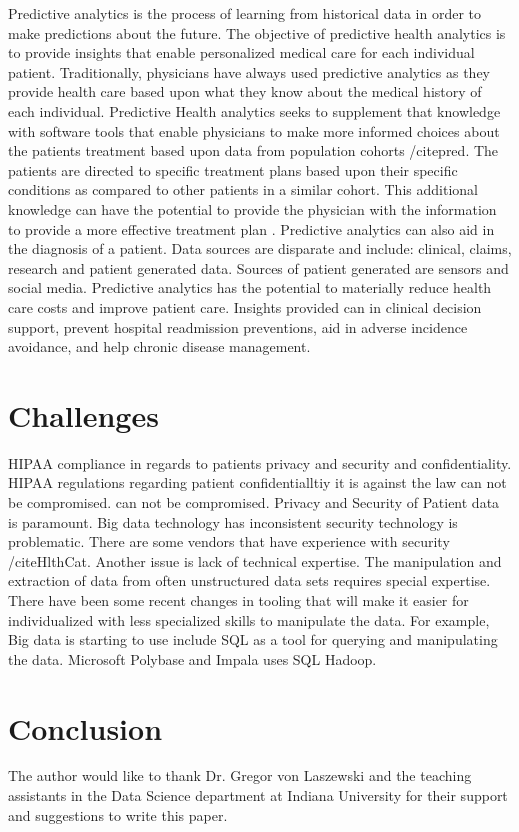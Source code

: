\documentclass[sigconf]{acmart}
\begin{document}
Predictive analytics is the process of learning from historical data in order to make predictions about the future. The objective of predictive health analytics is to provide insights that enable personalized medical care for each individual patient. Traditionally, physicians have always used predictive analytics as they provide health care based upon what they know about the medical history of each individual. Predictive Health analytics seeks to supplement that knowledge with software tools that enable physicians to make more informed choices about the patients treatment based upon data from population cohorts /cite{pred}.  The patients are directed to specific treatment plans based upon their specific conditions as compared to other patients in a similar cohort.  This additional knowledge can have the potential to provide the physician with the information to provide a more effective treatment plan \cite{www-google-pred}. Predictive analytics can also aid in the diagnosis of a patient. Data sources are disparate and include: clinical, claims, research and patient generated data. Sources of patient generated are sensors and social media.  
Predictive analytics has the potential to materially reduce health care costs and improve patient care.   Insights provided can in clinical decision support, prevent hospital readmission preventions, aid in adverse incidence avoidance, and help chronic disease management. 
  
  

\section{Challenges}
HIPAA compliance in regards to patients privacy and security and confidentiality. HIPAA regulations regarding patient confidentialltiy it is against the law can not be compromised. can not be compromised. Privacy and Security of Patient data is paramount. Big data technology has inconsistent security technology is problematic. There are some vendors that have experience with security /cite{HlthCat}. 
Another issue is lack of technical expertise. The manipulation and extraction of data from often unstructured data sets requires special expertise. There have been some recent changes in tooling that will make it easier for individualized with less specialized skills to manipulate the data. For example,  Big data is starting to use include SQL as a tool for querying and manipulating the data. Microsoft Polybase and Impala uses SQL Hadoop. 
 

\section{Conclusion}








\begin{acks}

  The author would like to thank Dr. Gregor von Laszewski and the teaching assistants in the Data Science department at Indiana University for their support and suggestions to write this paper.

\end{acks}




 
\end{document}
